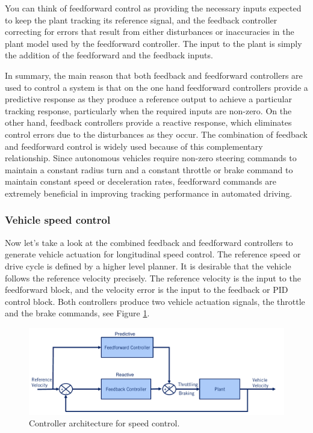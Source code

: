 You can think of feedforward control as
providing the necessary inputs expected to keep the plant tracking its reference
signal, and the feedback controller correcting for errors that result
from either disturbances or inaccuracies in the plant model
used by the feedforward controller. The input to the plant is simply
the addition of the feedforward and the feedback inputs. 

In summary, the main
reason that both feedback and feedforward controllers are used to control a system
is that on the one hand  feedforward controllers provide a predictive response as they produce
a reference output to achieve a particular tracking response, particularly when
the required inputs are non-zero. On the other hand, feedback controllers provide
a reactive response, which eliminates control errors due
to the disturbances as they occur. The combination of feedback and feedforward control is widely used because
of this complementary relationship. Since autonomous vehicles require
non-zero steering commands to maintain a constant radius turn and a constant
throttle or brake command to maintain constant speed or deceleration rates,
feedforward commands are extremely beneficial in improving
tracking performance in automated driving. 

\subsubsection{Vehicle speed control}

Now let's take a look at the combined
feedback and feedforward controllers to generate vehicle actuation for
longitudinal speed control. The reference speed or drive cycle is
defined by a higher level planner. It is desirable that the vehicle
follows the reference velocity precisely. The reference velocity is the input
to the feedforward block, and the velocity error is the input to
the feedback or PID control block. Both controllers produce two vehicle
actuation signals, the throttle and the brake commands, see Figure \ref{speed_control}. 

\begin{figure}[!htb]
\begin{center}
\includegraphics[scale=0.380]{img/longitudinal_control/speed_control.jpeg}
\end{center}
\caption{Controller architecture for speed control.}
\label{speed_control}
\end{figure}

